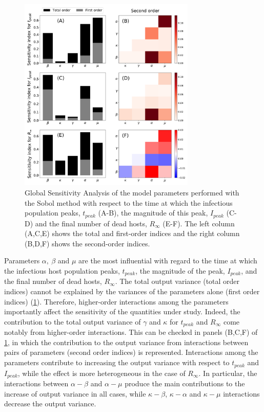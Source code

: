\begin{figure}[H]
    \centering
    \includegraphics[width=0.75\textwidth]{Figures/GSA.pdf}
    \caption{Global Sensitivity Analysis of the model parameters performed
        with the Sobol method with respect to the time at which the infectious
        population peaks, $t_{peak}$ (A-B), the magnitude of this peak,
        $I_{peak}$
        (C-D) and the final number of dead hosts, $R_{\infty}$ (E-F). The left
        column
        (A,C,E) shows the total and first-order indices and the right column
        (B,D,F)
        shows the second-order indices.}
    \label{fig:GSA}
\end{figure}

Parameters $\alpha, \ \beta$ and $\mu$ are the most influential with regard
to the time at which the infectious host population peaks, $t_{peak}$, the
magnitude of the peak, $I_{peak}$, and the final number of dead hosts,
$R_{\infty}$. The total output variance (total order indices) cannot be
explained by the variances of the parameters alone (first order indices)
(\cref{fig:GSA}). Therefore, higher-order interactions among the parameters
importantly affect the sensitivity of the quantities under study. Indeed, the
contribution to the total output variance of $\gamma$ and $\kappa$ for
$t_{peak}$ and $R_{\infty}$ come notably from higher-order interactions. This
can be checked in panels (B,C,F) of \cref{fig:GSA}, in which the contribution
to the output variance from interactions between pairs of parameters (second
order indices) is represented. Interactions among the parameters contribute to
increasing the output variance with respect to $t_{peak}$ and $I_{peak}$, while
the effect is more heterogeneous in the case of $R_{\infty}$. In particular,
the interactions between $\alpha-\beta$ and $\alpha-\mu$ produce the main
contributions to the increase of output variance in all cases, while
$\kappa-\beta$, $\kappa-\alpha$ and $\kappa-\mu$ interactions decrease the
output variance.

